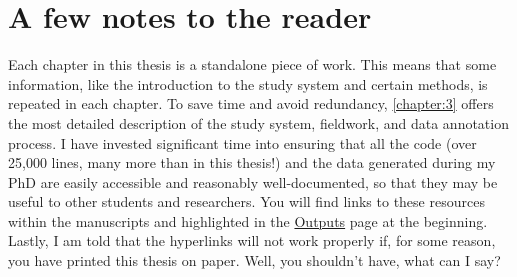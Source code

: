 \section{A few notes to the reader}
Each chapter in this thesis is a standalone piece of work. This means that some information, like the introduction to the study system and certain methods, is repeated in each chapter. To save time and avoid redundancy, \autoref{chapter:3} offers the most detailed description of the study system, fieldwork, and data annotation process. I have invested significant time into ensuring that all the code (over 25,000 lines, many more than in this thesis!) and the data generated during my PhD are easily accessible and reasonably well-documented, so that they may be useful to other students and researchers. You will find links to these resources within the manuscripts and highlighted in the \hyperref[outputs]{Outputs} page at the beginning.
Lastly, I am told that the hyperlinks will not work properly if, for some reason, you have printed this thesis on paper. Well, you shouldn't have, what can I say?

\renewcommand{\cleardoublepage}{}
\renewcommand{\clearpage}{}
\printbibliography

